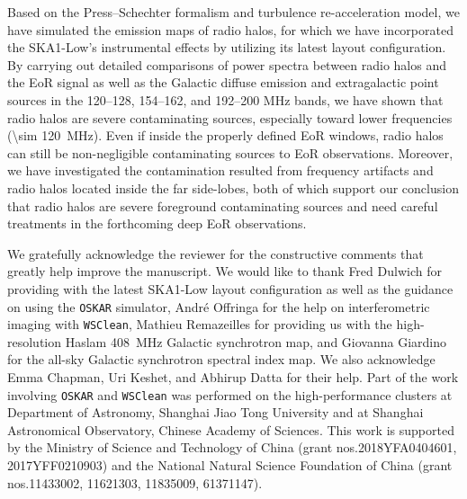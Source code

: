 \documentclass[twocolumn]{aastex62}
\newcommand{\editone}[1]{{\leavevmode\color{cyan}#1}}
\begin{document}
Based on the Press--Schechter formalism and turbulence re-acceleration
model, we have simulated the emission maps of radio halos, for which we
have incorporated the SKA1-Low's instrumental effects by utilizing its
latest layout configuration.
By carrying out detailed comparisons of power spectra between radio halos
and the EoR signal as well as the Galactic diffuse emission and
extragalactic point sources in the \numrange{120}{128},
\numrange{154}{162}, and \numrange{192}{200} \si{\MHz} bands,
we have shown that radio halos are severe contaminating sources,
especially toward lower frequencies (\SI{\sim 120}{\MHz}).
Even if inside the properly defined EoR windows, radio halos can still
be non-negligible contaminating sources to EoR observations.
Moreover, we have investigated the contamination resulted from
frequency artifacts and radio halos located inside the far side-lobes,
both of which support our conclusion that radio halos are severe
foreground contaminating sources and need careful treatments in the
forthcoming deep EoR observations.


\acknowledgments

\editone{We gratefully acknowledge the reviewer for the constructive
comments that greatly help improve the manuscript.}
We would like to thank
Fred Dulwich for providing with the latest SKA1-Low layout configuration
as well as the guidance on using the \texttt{OSKAR} simulator,
Andr\'e Offringa for the help on interferometric imaging with
\texttt{WSClean},
Mathieu Remazeilles for providing us with the high-resolution Haslam
\SI{408}{\MHz} Galactic synchrotron map,
and Giovanna Giardino for the all-sky Galactic synchrotron spectral
index map.
We also acknowledge Emma Chapman, Uri Keshet, and Abhirup Datta for
their help.
Part of the work involving \texttt{OSKAR} and \texttt{WSClean} was
performed on the high-performance clusters
at Department of Astronomy, Shanghai Jiao Tong University and
at Shanghai Astronomical Observatory, Chinese Academy of Sciences.
This work is supported by
the Ministry of Science and Technology of China
(grant nos.\@ 2018YFA0404601, 2017YFF0210903)
and the National Natural Science Foundation of China
(grant nos.\@ 11433002, 11621303, 11835009, 61371147).


%
\end{document}
